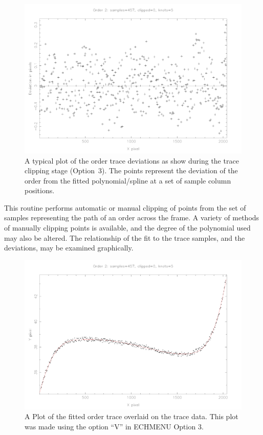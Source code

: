 \documentclass[twoside,11pt,nolof]{starlink}
\begin{document}
\begin{figure}
\begin{center}
\includegraphics[width=\textwidth]{sun152_02}

\parbox{140mm}{
\caption{A typical plot of the order trace deviations as show during
the trace clipping stage (Option~3).  The points represent the
deviation of the order from the fitted polynomial/spline at a set of
sample column positions.}
\label{fi_tclip}
}
\end{center}
\end{figure}

This routine performs automatic or manual  clipping of points from the
set of samples representing the path of an order across the frame.
A variety of methods of manually clipping points is available, and the degree
of the polynomial used may also be altered. The relationship of the fit
to the trace samples, and the deviations, may be examined graphically.

\begin{figure}
\begin{center}
\includegraphics[width=\textwidth]{sun152_03}

\parbox{140mm}{
\caption{A Plot of the fitted order trace overlaid on the trace data.
This plot was made using the option ``V'' in ECHMENU Option 3.}
\label{fi_tracefit}
}
\end{center}
\end{figure}
\end{document}
